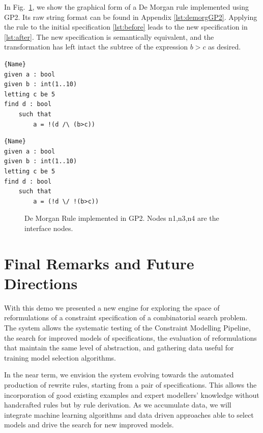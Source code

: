 In Fig.~\ref{fig:demorgan}, we show the graphical form of a De Morgan rule implemented using GP2. Its raw string format can be found in Appendix \ref{lst:demorgGP2}. Applying the rule to the initial specification \ref{lst:before} leads to the new specification in \ref{lst:after}. The new specification is semantically equivalent, and the transformation has left intact the subtree of the expression $b>c$ as desired.

\noindent\begin{minipage}{.45\textwidth}
\begin{lstlisting}[caption=Original Specification,label={lst:before},frame=tlrb]{Name}
given a : bool
given b : int(1..10)
letting c be 5
find d : bool
    such that
        a = !(d /\ (b>c))
\end{lstlisting}
\end{minipage}\hfill
\begin{minipage}{.45\textwidth}
\begin{lstlisting}[caption=Rewritten Specification,label={lst:after},frame=tlrb]{Name}
given a : bool
given b : int(1..10)
letting c be 5
find d : bool
    such that
        a = (!d \/ !(b>c))
\end{lstlisting}
\end{minipage}


\begin{figure}[htbp]
\centering
  
  \caption{De Morgan Rule implemented in GP2. Nodes n1,n3,n4 are the interface nodes.}
  \label{fig:demorgan}
\end{figure}

\section{Final Remarks and Future Directions}

With this demo we presented a new engine for exploring the space of reformulations of a constraint specification of a combinatorial search problem. The system allows the systematic testing of the Constraint Modelling Pipeline, the search for improved models of \essence specifications, the evaluation of reformulations that maintain the same level of abstraction, and gathering data useful for training model selection algorithms.

In the near term, we envision the system evolving towards the automated production of rewrite rules, starting from a pair of specifications. This allows the incorporation of good existing examples and expert modellers' knowledge without handcrafted rules but by rule derivation.
As we accumulate data, we will integrate machine learning algorithms and data driven approaches able to select models and drive the search for new improved models.

